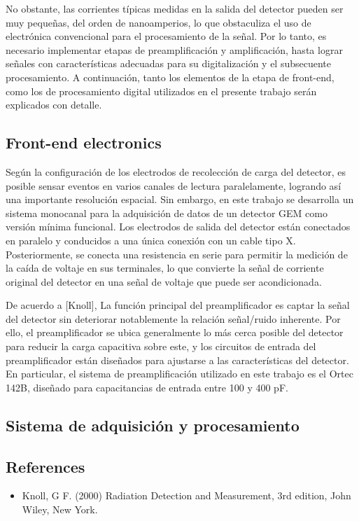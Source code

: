 \documentclass[]{book}
\begin{document}
\noindent No obstante, las corrientes típicas medidas en la salida del detector pueden ser muy pequeñas, del orden de nanoamperios, lo que obstaculiza el uso de electrónica convencional para el procesamiento de la señal. Por lo tanto, es necesario implementar etapas de preamplificación y amplificación, hasta lograr señales con características adecuadas para su digitalización y el subsecuente procesamiento. A continuación, tanto los elementos de la etapa de front-end, como los de procesamiento digital utilizados en el presente trabajo serán explicados con detalle.

\subsection*{Front-end electronics}

\noindent Según la configuración de los electrodos de recolección de carga del detector, es posible sensar eventos en varios canales de lectura paralelamente, logrando así una importante resolución espacial. Sin embargo, en este trabajo se desarrolla un sistema monocanal para la adquisición de datos de un detector GEM como versión mínima funcional. Los electrodos de salida del detector están conectados en paralelo y conducidos a una única conexión con un cable tipo X. Posteriormente, se conecta una resistencia en serie para permitir la medición de la caída de voltaje en sus terminales, lo que convierte la señal de corriente original del detector en una señal de voltaje que puede ser acondicionada.


\noindent De acuerdo a [Knoll], La función principal del preamplificador es captar la señal del detector sin deteriorar notablemente la relación señal/ruido inherente. Por ello, el preamplificador se ubica generalmente lo más cerca posible del detector para reducir la carga capacitiva sobre este, y los circuitos de entrada del preamplificador están diseñados para ajustarse a las características del detector. En particular, el sistema de preamplificación utilizado en este trabajo es el Ortec 142B, diseñado para capacitancias de entrada entre 100 y 400 pF. %





\subsection*{Sistema de adquisición y procesamiento}

\noindent 

\subsection*{References}
\begin{itemize}
    \item Knoll, G F. (2000) Radiation Detection and Measurement, 3rd edition, John Wiley, New
    York.
\end{itemize}
\end{document}

